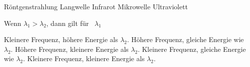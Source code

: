 \documentclass[11pt]{exam}
\begin{document}
\begin{questions}
\begin{choices}
	\choice Röntgenstrahlung
	\choice Langwelle
	\choice Infrarot
	\choice Mikrowelle
	\choice Ultraviolett
\end{choices}

\vspace{3mm}\question Wenn \( \lambda_1 > \lambda_2 \), dann gilt für  \( \lambda_1 \)

\begin{choices}
	\choice Kleinere Frequenz, höhere Energie als \( \lambda_2 \).
	\choice Höhere Frequenz, gleiche Energie wie \( \lambda_2 \).
	\choice Höhere Frequenz, kleinere Energie als \( \lambda_2 \).
	\choice Kleinere Frequenz, gleiche Energie wie \( \lambda_2 \).
	\choice Kleinere Frequenz, kleinere Energie als \( \lambda_2 \).
\end{choices}

\vspace{3mm}\end{questions}
\end{document}
